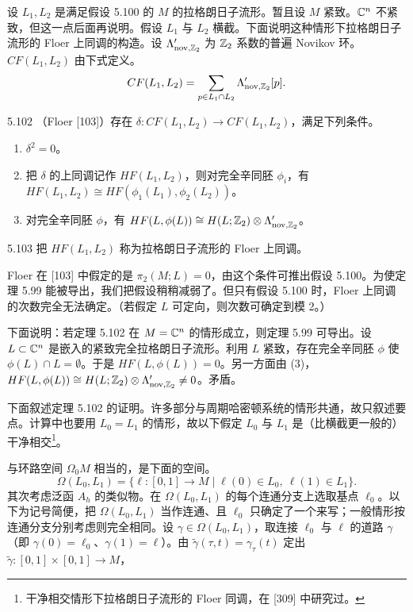 设 $L_1,L_2$ 是满足假设 5.100 的 $M$ 的拉格朗日子流形。暂且设 $M$ 紧致。$\mathbb{C}^n$ 不紧致，但这一点后面再说明。假设 $L_1$ 与 $L_2$ 横截。下面说明这种情形下拉格朗日子流形的 Floer 上同调的构造。设 $\Lambda'_{\mathrm{nov},\mathbb{Z}_2}$ 为 $\mathbb{Z}_2$ 系数的普遍 Novikov 环。$CF(L_1,L_2)$ 由下式定义。
\[
CF(L_1,L_2)=\sum_{p\in L_1\cap L_2}\Lambda'_{\mathrm{nov},\mathbb{Z}_2}[p].
\]

\begin{theorem}{5.102}
  （Floer [103]）存在 $\delta\colon CF(L_1,L_2)\to CF(L_1,L_2)$，满足下列条件。

  \begin{enumerate}[label=(\arabic*),leftmargin=2.4em,itemsep=1pt,topsep=2pt]
    \item $\delta^2=0$。
    \item 把 $\delta$ 的上同调记作 $HF(L_1,L_2)$，则对完全辛同胚 $\phi_i$，有 $HF(L_1,L_2)\cong HF(\phi_1(L_1),\phi_2(L_2))$。
    \item 对完全辛同胚 $\phi$，有 $HF(L,\phi(L))\cong H(L;\mathbb{Z}_2)\otimes\Lambda'_{\mathrm{nov},\mathbb{Z}_2}$。
  \end{enumerate}
\end{theorem}

\begin{definition}{5.103}
  把 $HF(L_1,L_2)$ 称为拉格朗日子流形的 Floer 上同调。
\end{definition}

Floer 在 [103] 中假定的是 $\pi_2(M;L)=0$，由这个条件可推出假设 5.100。为使定理 5.99 能被导出，我们把假设稍稍减弱了。但只有假设 5.100 时，Floer 上同调的次数完全无法确定。（若假定 $L$ 可定向，则次数可确定到模 2。）

下面说明：若定理 5.102 在 $M=\mathbb{C}^n$ 的情形成立，则定理 5.99 可导出。设 $L\subset\mathbb{C}^n$ 是嵌入的紧致完全拉格朗日子流形。利用 $L$ 紧致，存在完全辛同胚 $\phi$ 使 $\phi(L)\cap L=\emptyset$。于是 $HF(L,\phi(L))=0$。另一方面由 (3)，$HF(L,\phi(L))\cong H(L;\mathbb{Z}_2)\otimes\Lambda'_{\mathrm{nov},\mathbb{Z}_2}\neq0$。矛盾。

下面叙述定理 5.102 的证明。许多部分与周期哈密顿系统的情形共通，故只叙述要点。计算中也要用 $L_0=L_1$ 的情形，故以下假定 $L_0$ 与 $L_1$ 是（比横截更一般的）干净相交\footnote{干净相交情形下拉格朗日子流形的 Floer 同调，在 [309] 中研究过。}。

与环路空间 $\Omega_0M$ 相当的，是下面的空间。
\[
\Omega(L_0,L_1)=\{\ell\colon[0,1]\to M\mid \ell(0)\in L_0,\ \ell(1)\in L_1\}.
\]
其次考虑泛函 $A_h$ 的类似物。在 $\Omega(L_0,L_1)$ 的每个连通分支上选取基点 $\ell_0$。以下为记号简便，把 $\Omega(L_0,L_1)$ 当作连通、且 $\ell_0$ 只确定了一个来写；一般情形按连通分支分别考虑则完全相同。设 $\gamma\in\Omega(L_0,L_1)$，取连接 $\ell_0$ 与 $\ell$ 的道路 $\gamma$（即 $\gamma(0)=\ell_0$、$\gamma(1)=\ell$）。由 $\tilde\gamma(\tau,t)=\gamma_\tau(t)$ 定出 $\tilde\gamma\colon[0,1]\times[0,1]\to M$，

